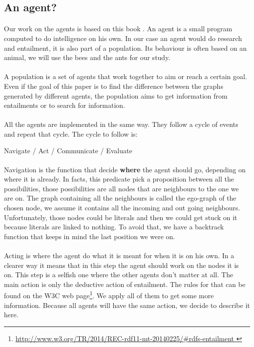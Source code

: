 \documentclass{article}
\begin{document}
	\subsection{An agent?}
		\paragraph{}
			Our work on the agents is based on this book \cite{Engelbrecht05}.
			An agent is a small program computed to do intelligence on his own.
			In our case an agent would do research and entailment,
			it is also part of a population.
			Its behaviour is often based on an animal, we will use the bees and the ants for our study.
		\paragraph{}
			A population is a set of agents that work together to aim or reach a certain goal.
			Even if the goal of this paper is to find the difference between the graphs generated by different agents,
			the population aims to get information from entailments or to search for information.
		\paragraph{}
			All the agents are implemented in the same way.
			They follow a cycle of events and repeat that cycle.
			The cycle to follow is:
		\begin{center}
			Navigate / Act / Communicate / Evaluate
		\end{center}
		\paragraph{}
			Navigation is the function that decide \textbf{where} the agent should go, depending on where it is already.
			In facts, this predicate pick a proposition between all the possibilities,
			those possibilities are all nodes that are neighbours to the one we are on.
			The graph containing all the neighbours is called the ego-graph of the chosen node,
			we assume it contains all the incoming and out going neighbours.
			Unfortunately, those nodes could be literals and then we could get stuck on it because literals are linked to nothing.
			To avoid that, we have a backtrack function that keeps in mind the last position we were on.
		\paragraph{}
			Acting is where the agent do what it is meant for when it is on his own.
			In a clearer way it means that in this step the agent should work on the nodes it is on.
			This step is a selfish one where the other agents don't matter at all.
			The main action is only the deductive action of entailment.
			The rules for that can be found on the W3C web page\footnote{
				\url{http://www.w3.org/TR/2014/REC-rdf11-mt-20140225/\#rdfs-entailment
			}}.
			We apply all of them to get some more information.
			Because all agents will have the same action, we decide to describe it here.
\end{document}
